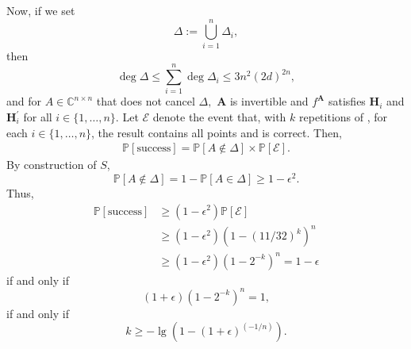\documentclass[sigconf]{acmart}
\def\mA{{\bm A}}
\def\C{\mathbb{C}}
\def\pr{\mathbb{P}}
\begin{document}
 Now, if we set
\[
 \Delta := \bigcup_{i=1}^n \Delta_i,
\]
then
\[
\deg \Delta \leq \sum_{i=1}^n \deg \Delta_i  \leq 3n^2(2d)^{2n},
\] 
and for $A \in \C^{n \times n}$ that does not cancel $\Delta,$  $\mA$ is invertible and $f^\mA$
  satisfies $\textbf{H}_i$ and $\textbf{H}_i^{'}$ for all $i \in \{1,\hdots,n\}.$ Let $\mathscr{E}$ denote the event that, with $k$ repetitions of \cite[Algorithm 2]{SH}, for each $i \in \{1,\hdots,n\}$, the result contains all points and is correct.  Then, 
\begin{align*}
\pr[\textrm{success}] = \pr[A \not\in \Delta] \times \pr[\mathscr{E}].  
\end{align*}
By construction of $S$,
\[
\pr[A \not\in \Delta] = 1-\pr[A \in \Delta] \geq
1-\epsilon^2.
\]
Thus, 
\begin{align*}
\pr[\textrm{success}] &\geq  (1-\epsilon^2)\pr[\mathscr{E}]\\
&\geq (1-\epsilon^2)(1-(11/32)^k)^n\\
& \geq (1-\epsilon^2)(1-2^{-k})^n= 1-\epsilon
\end{align*}
if and only if 
\[
(1+\epsilon)(1-2^{-k})^n= 1,
\]
if and only if 
\[
k \geq -\lg\left ( 1 - (1+\epsilon)^{(-1/n)} \right ).
\]


\end{document}
